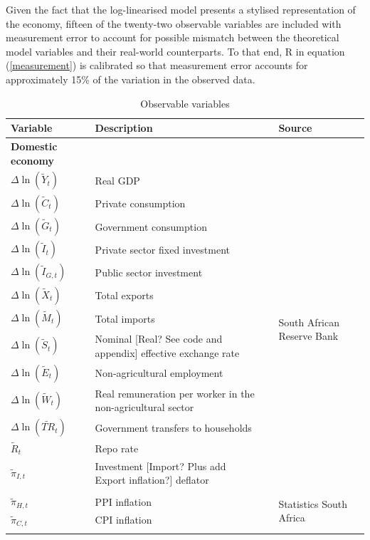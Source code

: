 \documentclass[a4paper,11pt]{article}
\numberwithin{equation}{section}
\begin{document}
	Given the fact that the log-linearised model presents a stylised representation of the economy, fifteen of the twenty-two observable variables are included with measurement error to account for possible mismatch between the theoretical model variables and their real-world counterparts. To that end, R in equation (\ref{measurement}) is calibrated so that measurement error accounts for approximately 15\% of the variation in the observed data.
	
	\begin{table}[t]
		\small
		\centering
		\captionsetup{skip=6pt}
		\caption{Observable variables}
		\begin{tabular}{p{3.3cm} p{6.5cm} p{0.2cm} p{4.5cm}} 
			\toprule
			Variable & Description & & Source  \\
			\hline
			\textbf{Domestic economy} && & \\
			$\Delta\ln(\tilde{Y}_t)$ & Real GDP && \multirow{13}{4.5cm}{South African Reserve Bank}\\
			$\Delta\ln(\tilde{C}_t)$ & Private consumption &&\\
			$\Delta\ln(\tilde{G}_t)$ & Government consumption  &&\\
			$\Delta\ln(\tilde{I}_t)$ & Private sector fixed investment &&\\
			$\Delta\ln(\tilde{I}_{G,t})$ & Public sector investment &&\\
			$\Delta\ln(\tilde{X}_t)$ & Total exports &&\\
			$\Delta\ln(\tilde{M}_t)$ & Total imports &&\\
			$\Delta\ln(\tilde{S}_t)$ & {\color{red}Nominal [Real? See code and appendix]} effective exchange rate &&\\
			$\Delta\ln(\tilde{E}_t)$ & Non-agricultural employment &&\\
			$\Delta\ln(\tilde{W}_t)$ & Real remuneration per worker in the non-agricultural sector &&\\
			$\Delta\ln(\tilde{TR}_t)$ & Government transfers to households &&\\
			$\tilde{R}_t$ & Repo rate && \\
			$\tilde{\pi}_{I,t}$ & {\color{red}Investment [Import? Plus add Export inflation?] deflator} && \\
			&&&\\
			$\tilde{\pi}_{H,t}$ & PPI inflation && \multirow{2}{4.5cm}{Statistics South Africa}\\
			$\tilde{\pi}_{C,t}$ & CPI inflation && \\
			&&& \\

\end{tabular}
\end{table}
\end{document}
